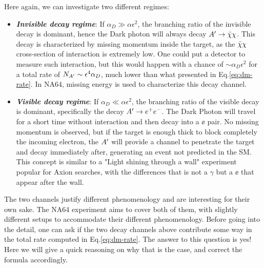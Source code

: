 Here again, we can investigate two different regimes:
\begin{itemize}
\item \textbf{\textit{Invisible decay regime}}: If $\alpha_D \gg \alpha \epsilon^2$, the branching ratio of the invisible decay is dominant, hence the Dark photon will always decay $A' \to \bar{\chi} \chi$. This decay is characterized by missing momentum inside the target, as the $\bar{\chi} \chi$ cross-section of interaction is extremely low. One could put a detector to measure such interaction, but this would happen with a chance of $\sim \alpha_D \epsilon^2$ for a total rate of $N_{A'} \sim \epsilon^4 \alpha_D$, much lower than what presented in Eq.\ref{eq:dm-rate}. In NA64, missing energy is used to characterize this decay channel. 
\item \textbf{\textit{Visible decay regime}}: If $\alpha_D \ll \alpha \epsilon^2$, the branching ratio of the visible decay is dominant, specifically the decay $A' \to e^+e^-$. The Dark Photon will travel for a short time without interaction and then decay into a $\ee$ pair. No missing momentum is observed, but if the target is enough thick to block completely the incoming electron, the $A'$ will provide a channel to penetrate the target and decay immediately after, generating an event not predicted in the SM. This concept is similar to a "Light shining through a wall" experiment popular for Axion searches, with the differences that is not a $\gamma$ but a $\ee$ that appear after the wall.
\end{itemize}

The two channels justify different phenomenology and are interesting for their own sake. The NA64 experiment aims to cover both of them, with slightly different setups to accommodate their different phenomenology. Before going into the detail, one can ask if the two decay channels above contribute some way in the total rate computed in Eq.\ref{eq:dm-rate}. The answer to this question is yes! Here we will give a quick reasoning on why that is the case, and correct the formula accordingly.

